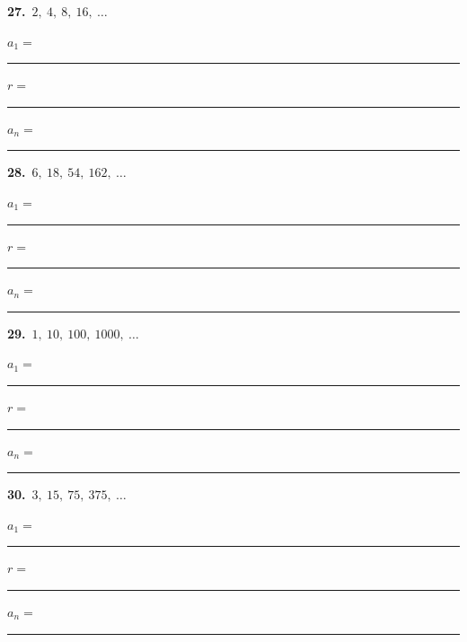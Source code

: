 \documentclass[11pt,letterpaper]{article}
\begin{document}
\needspace{2.0cm}\par\vspace{3mm}\noindent\begin{minipage}[t]{0.48\linewidth}{\color{fmturn}\bfseries 27.}\ $2,\ 4,\ 8,\ 16,\ \ldots$\par\vspace{2mm}\hspace*{4mm}$a_1=$\,\rule{1.2cm}{0.4pt}\quad $r=$\,\rule{1.2cm}{0.4pt}\par\vspace{2.5mm}\hspace*{4mm}$a_n=$\,\rule{3.6cm}{0.4pt}\end{minipage}\hfill\begin{minipage}[t]{0.48\linewidth}{\color{fmturn}\bfseries 28.}\ $6,\ 18,\ 54,\ 162,\ \ldots$\par\vspace{2mm}\hspace*{4mm}$a_1=$\,\rule{1.2cm}{0.4pt}\quad $r=$\,\rule{1.2cm}{0.4pt}\par\vspace{2.5mm}\hspace*{4mm}$a_n=$\,\rule{3.6cm}{0.4pt}\end{minipage}\par\vspace{1.0cm}
\needspace{2.0cm}\par\vspace{3mm}\noindent\begin{minipage}[t]{0.48\linewidth}{\color{fmturn}\bfseries 29.}\ $1,\ 10,\ 100,\ 1000,\ \ldots$\par\vspace{2mm}\hspace*{4mm}$a_1=$\,\rule{1.2cm}{0.4pt}\quad $r=$\,\rule{1.2cm}{0.4pt}\par\vspace{2.5mm}\hspace*{4mm}$a_n=$\,\rule{3.6cm}{0.4pt}\end{minipage}\hfill\begin{minipage}[t]{0.48\linewidth}{\color{fmturn}\bfseries 30.}\ $3,\ 15,\ 75,\ 375,\ \ldots$\par\vspace{2mm}\hspace*{4mm}$a_1=$\,\rule{1.2cm}{0.4pt}\quad $r=$\,\rule{1.2cm}{0.4pt}\par\vspace{2.5mm}\hspace*{4mm}$a_n=$\,\rule{3.6cm}{0.4pt}\end{minipage}\par\vspace{1.0cm}
\end{document}
